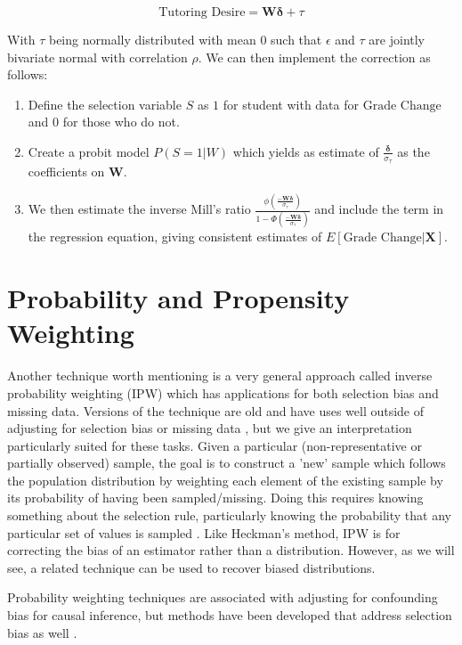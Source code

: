 \documentclass[12pt,twoside]{reedthesis}
\theoremstyle{definition}
\begin{document}
$$\text{Tutoring Desire} = \mathbf{W}  \boldsymbol{\delta} + \tau$$

With $\tau$ being normally distributed with mean $0$ such that $\epsilon$ and $\tau$ are jointly bivariate normal with correlation $\rho$. We can then implement the correction as follows:

\begin{enumerate}
\item Define the selection variable $S$ as $1$ for student with data for $\text{Grade Change}$ and $0$ for those who do not.

\item Create a probit model $P(S=1 | W)$ which yields as estimate of $\frac{\boldsymbol{\delta}}{\sigma_\tau}$ as the coefficients on $\mathbf{W}$.

\item We then estimate the inverse Mill's ratio $\frac{\phi(\frac{-\mathbf{W} \boldsymbol{\delta}}{\sigma_\tau})}{1 - \Phi(\frac{-\mathbf{W} \boldsymbol{\delta}}{\sigma_\tau})}$ and include the term in the regression equation, giving consistent estimates of $E[\text{Grade Change} | \mathbf{X}]$.
\end{enumerate}



\section{Probability and Propensity Weighting}

Another technique worth mentioning is a very general approach called inverse probability weighting (IPW) which has applications for both selection bias and missing data. Versions of the technique are old  and have uses well outside of adjusting for selection bias or missing data \citep{Horvitz_1952}, but we give an interpretation particularly suited for these tasks. Given a particular (non-representative or partially observed) sample, the goal is to construct a 'new' sample which follows the population distribution by weighting each element of the existing sample by its probability of having been sampled/missing. Doing this requires knowing something about the selection rule, particularly knowing the probability that any particular set of values is sampled \cite{Cortes_2008}. Like Heckman's method, IPW is for correcting the bias of an estimator rather than a distribution. However, as we will see, a related technique can be used to recover biased distributions. 

Probability weighting techniques are associated with adjusting for confounding bias for causal inference, but methods have been developed that address selection bias as well \citep{Correa_2017}.
\end{document}
